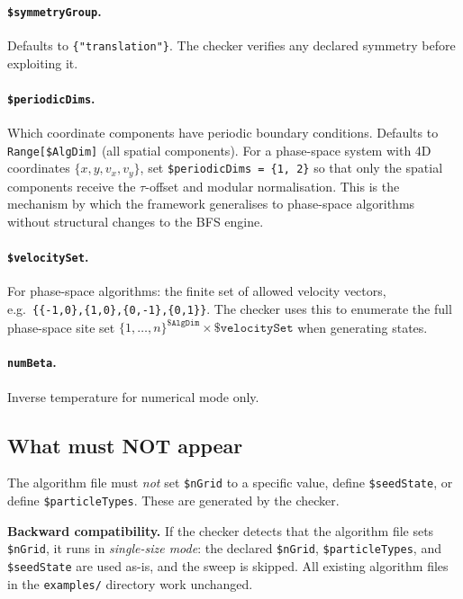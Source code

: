 \documentclass[12pt,a4paper]{article}
\begin{document}
\paragraph{\texttt{\$symmetryGroup}.}
Defaults to \texttt{\{"translation"\}}.  The checker verifies any declared
symmetry before exploiting it.

\paragraph{\texttt{\$periodicDims}.}
Which coordinate components have periodic boundary conditions.  Defaults to
\texttt{Range[\$AlgDim]} (all spatial components).  For a phase-space system
with 4D coordinates $\{x, y, v_x, v_y\}$, set
\texttt{\$periodicDims = \{1, 2\}} so that only the spatial components receive
the $\tau$-offset and modular normalisation.  This is the mechanism by which
the framework generalises to phase-space algorithms without structural changes
to the BFS engine.

\paragraph{\texttt{\$velocitySet}.}
For phase-space algorithms: the finite set of allowed velocity vectors,
e.g.\ \texttt{\{\{-1,0\},\{1,0\},\{0,-1\},\{0,1\}\}}.  The checker uses this
to enumerate the full phase-space site set $\{1,\ldots,n\}^{\texttt{\$AlgDim}}
\times \texttt{\$velocitySet}$ when generating states.

\paragraph{\texttt{numBeta}.}
Inverse temperature for numerical mode only.

\subsection{What must NOT appear}

The algorithm file must \emph{not} set \texttt{\$nGrid} to a specific value,
define \texttt{\$seedState}, or define \texttt{\$particleTypes}.  These are
generated by the checker.

\begin{warnbox}
\textbf{Backward compatibility.} If the checker detects that the algorithm
file sets \texttt{\$nGrid}, it runs in \emph{single-size mode}: the declared
\texttt{\$nGrid}, \texttt{\$particleTypes}, and \texttt{\$seedState} are used
as-is, and the sweep is skipped.  All existing algorithm files in the
\texttt{examples/} directory work unchanged.
\end{warnbox}
\end{document}
